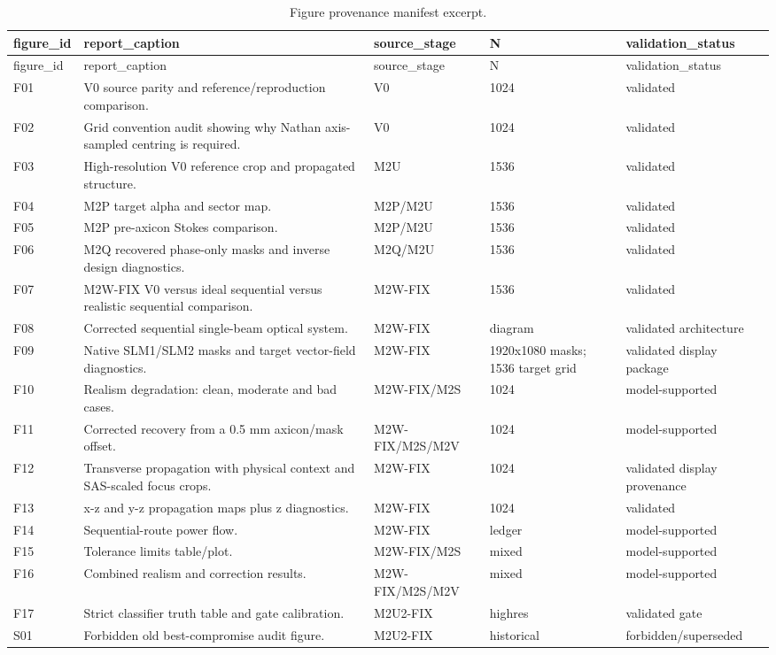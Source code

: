 \documentclass[11pt,a4paper]{report}
\begin{document}
\begin{longtable}{p{}p{}p{}p{}p{}}
\caption{Figure provenance manifest excerpt.}\label{tab:fig-manifest}\\
\toprule
figure\_id & report\_caption & source\_stage & N & validation\_status\\
\midrule
\endfirsthead
\toprule
figure\_id & report\_caption & source\_stage & N & validation\_status\\
\midrule
\endhead
F01 & V0 source parity and reference/reproduction comparison. & V0 & 1024 & validated\\
F02 & Grid convention audit showing why Nathan axis-sampled centring is required. & V0 & 1024 & validated\\
F03 & High-resolution V0 reference crop and propagated structure. & M2U & 1536 & validated\\
F04 & M2P target alpha and sector map. & M2P/M2U & 1536 & validated\\
F05 & M2P pre-axicon Stokes comparison. & M2P/M2U & 1536 & validated\\
F06 & M2Q recovered phase-only masks and inverse design diagnostics. & M2Q/M2U & 1536 & validated\\
F07 & M2W-FIX V0 versus ideal sequential versus realistic sequential comparison. & M2W-FIX & 1536 & validated\\
F08 & Corrected sequential single-beam optical system. & M2W-FIX & diagram & validated architecture\\
F09 & Native SLM1/SLM2 masks and target vector-field diagnostics. & M2W-FIX & 1920x1080 masks; 1536 target grid & validated display package\\
F10 & Realism degradation: clean, moderate and bad cases. & M2W-FIX/M2S & 1024 & model-supported\\
F11 & Corrected recovery from a 0.5 mm axicon/mask offset. & M2W-FIX/M2S/M2V & 1024 & model-supported\\
F12 & Transverse propagation with physical context and SAS-scaled focus crops. & M2W-FIX & 1024 & validated display provenance\\
F13 & x-z and y-z propagation maps plus z diagnostics. & M2W-FIX & 1024 & validated\\
F14 & Sequential-route power flow. & M2W-FIX & ledger & model-supported\\
F15 & Tolerance limits table/plot. & M2W-FIX/M2S & mixed & model-supported\\
F16 & Combined realism and correction results. & M2W-FIX/M2S/M2V & mixed & model-supported\\
F17 & Strict classifier truth table and gate calibration. & M2U2-FIX & highres & validated gate\\
S01 & Forbidden old best-compromise audit figure. & M2U2-FIX & historical & forbidden/superseded\\
\bottomrule
\end{longtable}
\end{document}
